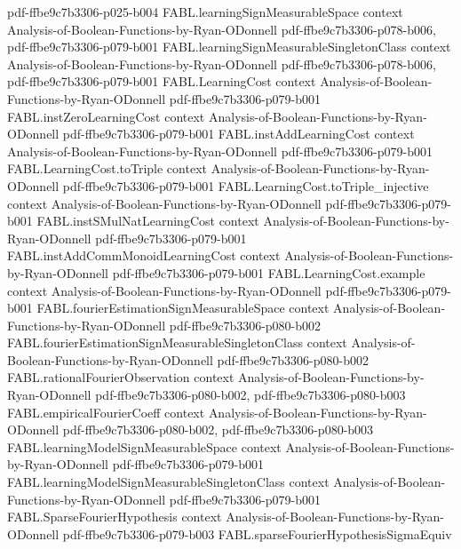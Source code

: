 \begin{theorem}
  {pdf-ffbe9c7b3306-p025-b004}
\proofstep
  {FABL.learningSignMeasurableSpace}
  {context}
  {Analysis-of-Boolean-Functions-by-Ryan-ODonnell}
  {pdf-ffbe9c7b3306-p078-b006,
    pdf-ffbe9c7b3306-p079-b001}
\proofstep
  {FABL.learningSignMeasurableSingletonClass}
  {context}
  {Analysis-of-Boolean-Functions-by-Ryan-ODonnell}
  {pdf-ffbe9c7b3306-p078-b006,
    pdf-ffbe9c7b3306-p079-b001}
\proofstep
  {FABL.LearningCost}
  {context}
  {Analysis-of-Boolean-Functions-by-Ryan-ODonnell}
  {pdf-ffbe9c7b3306-p079-b001}
\proofstep
  {FABL.instZeroLearningCost}
  {context}
  {Analysis-of-Boolean-Functions-by-Ryan-ODonnell}
  {pdf-ffbe9c7b3306-p079-b001}
\proofstep
  {FABL.instAddLearningCost}
  {context}
  {Analysis-of-Boolean-Functions-by-Ryan-ODonnell}
  {pdf-ffbe9c7b3306-p079-b001}
\proofstep
  {FABL.LearningCost.toTriple}
  {context}
  {Analysis-of-Boolean-Functions-by-Ryan-ODonnell}
  {pdf-ffbe9c7b3306-p079-b001}
\proofstep
  {FABL.LearningCost.toTriple_injective}
  {context}
  {Analysis-of-Boolean-Functions-by-Ryan-ODonnell}
  {pdf-ffbe9c7b3306-p079-b001}
\proofstep
  {FABL.instSMulNatLearningCost}
  {context}
  {Analysis-of-Boolean-Functions-by-Ryan-ODonnell}
  {pdf-ffbe9c7b3306-p079-b001}
\proofstep
  {FABL.instAddCommMonoidLearningCost}
  {context}
  {Analysis-of-Boolean-Functions-by-Ryan-ODonnell}
  {pdf-ffbe9c7b3306-p079-b001}
\proofstep
  {FABL.LearningCost.example}
  {context}
  {Analysis-of-Boolean-Functions-by-Ryan-ODonnell}
  {pdf-ffbe9c7b3306-p079-b001}
\proofstep
  {FABL.fourierEstimationSignMeasurableSpace}
  {context}
  {Analysis-of-Boolean-Functions-by-Ryan-ODonnell}
  {pdf-ffbe9c7b3306-p080-b002}
\proofstep
  {FABL.fourierEstimationSignMeasurableSingletonClass}
  {context}
  {Analysis-of-Boolean-Functions-by-Ryan-ODonnell}
  {pdf-ffbe9c7b3306-p080-b002}
\proofstep
  {FABL.rationalFourierObservation}
  {context}
  {Analysis-of-Boolean-Functions-by-Ryan-ODonnell}
  {pdf-ffbe9c7b3306-p080-b002,
    pdf-ffbe9c7b3306-p080-b003}
\proofstep
  {FABL.empiricalFourierCoeff}
  {context}
  {Analysis-of-Boolean-Functions-by-Ryan-ODonnell}
  {pdf-ffbe9c7b3306-p080-b002,
    pdf-ffbe9c7b3306-p080-b003}
\proofstep
  {FABL.learningModelSignMeasurableSpace}
  {context}
  {Analysis-of-Boolean-Functions-by-Ryan-ODonnell}
  {pdf-ffbe9c7b3306-p079-b001}
\proofstep
  {FABL.learningModelSignMeasurableSingletonClass}
  {context}
  {Analysis-of-Boolean-Functions-by-Ryan-ODonnell}
  {pdf-ffbe9c7b3306-p079-b001}
\proofstep
  {FABL.SparseFourierHypothesis}
  {context}
  {Analysis-of-Boolean-Functions-by-Ryan-ODonnell}
  {pdf-ffbe9c7b3306-p079-b003}
\proofstep
  {FABL.sparseFourierHypothesisSigmaEquiv}

\end{theorem}
